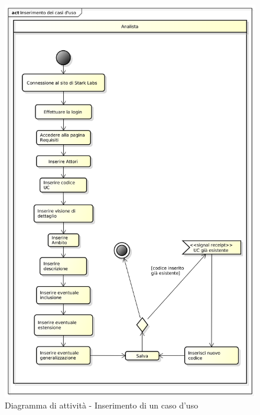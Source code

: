 \begin{figure}[htbp]
\centering
\includegraphics[scale=0.5]{immagini/inserimento_uc.png}
\captionsetup{labelfont=bf}
\caption{Diagramma di attività - Inserimento di un caso d'uso}\label{sec:Figura1}
\end{figure}

